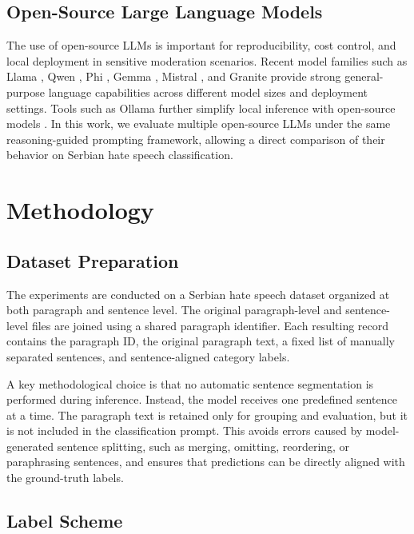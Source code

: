 \documentclass[a4paper]{article}
\begin{document}
\subsection{Open-Source Large Language Models}

The use of open-source LLMs is important for reproducibility, cost control, and local deployment in sensitive moderation scenarios. Recent model families such as Llama \cite{grattafiori2024llama}, Qwen \cite{qwen2025qwen3}, Phi \cite{abdin2024phi3,abdin2024phi4}, Gemma \cite{googledeepmind2025gemma3}, Mistral \cite{mistral}, and Granite \cite{mishra2024granite} provide strong general-purpose language capabilities across different model sizes and deployment settings. Tools such as Ollama further simplify local inference with open-source models \cite{marcondes2025using}. In this work, we evaluate multiple open-source LLMs under the same reasoning-guided prompting framework, allowing a direct comparison of their behavior on Serbian hate speech classification.\section{Methodology}

\subsection{Dataset Preparation}

The experiments are conducted on a Serbian hate speech dataset organized at both paragraph and sentence level. The original paragraph-level and sentence-level files are joined using a shared paragraph identifier. Each resulting record contains the paragraph ID, the original paragraph text, a fixed list of manually separated sentences, and sentence-aligned category labels.

A key methodological choice is that no automatic sentence segmentation is performed during inference. Instead, the model receives one predefined sentence at a time. The paragraph text is retained only for grouping and evaluation, but it is not included in the classification prompt. This avoids errors caused by model-generated sentence splitting, such as merging, omitting, reordering, or paraphrasing sentences, and ensures that predictions can be directly aligned with the ground-truth labels.

\subsection{Label Scheme}
\end{document}
